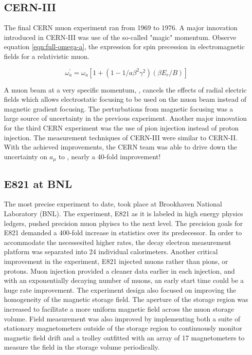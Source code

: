 \subsection{CERN-III}
The final CERN muon \gmtwo experiment ran from 1969 to 1976.  A major innovation introduced in CERN-III was use of the so-called "magic" momentum. Observe equation \ref{eqn:full-omega-a}, the expression for spin precession in electromagnetic fields for a relativistic muon.

\begin{equation}
\label{eqn:full-omega-a}
\omega^\prime_a = \omega_a[1 + (1 - 1 / a \beta^2 \gamma^2)(\beta E_r / B)]
\end{equation}

\noindent A muon beam at a very specific momentum, \pmagic, cancels the effects of radial electric fields which allows electrostatic focusing to be used on the muon beam instead of magnetic gradient focusing.  The perturbations from magnetic focusing was a large source of uncertainty in the previous experiment.  Another major innovation for the third CERN experiment was the use of pion injection instead of proton injection.  The measurement techniques of CERN-III were similar to CERN-II.  With the achieved improvements, the CERN team was able to drive down the uncertainty on $a_\mu$ to \cite{47y-muon-g-2}, nearly a 40-fold improvement!

\subsection{E821 at BNL}
The most precise \mugmtwo experiment to date, took place at Brookhaven National Laboratory (BNL). The experiment, E821 as it is labeled in high energy physics ledgers, pushed precision muon phyiscs to the next level.  The precision goals for E821 demanded a 400-fold increase in statistics over its predecessor.  In order to accommodate the necessesited higher rates, the decay electron measurement platform was separated into 24 individual calorimeters.  Another critical improvement in the experiment, E821 injected muons rather than pions, or protons.  Muon injection provided a cleaner data earlier in each injection, and with an exponentially decaying number of muons, an early start time could be a huge rate improvement.  The experiment design also focused on improving the homogeneity of the magnetic storage field.  The aperture of the storage region was increased to facilitate a more uniform magnetic field across the muon storage volume.  Field measurement was also improved by implementing both a suite of stationary magnetometers outside of the storage region to continuously monitor magnetic field drift and a trolley outfitted with an array of 17 magnetometers to measure the field in the storage volume periodically.  

